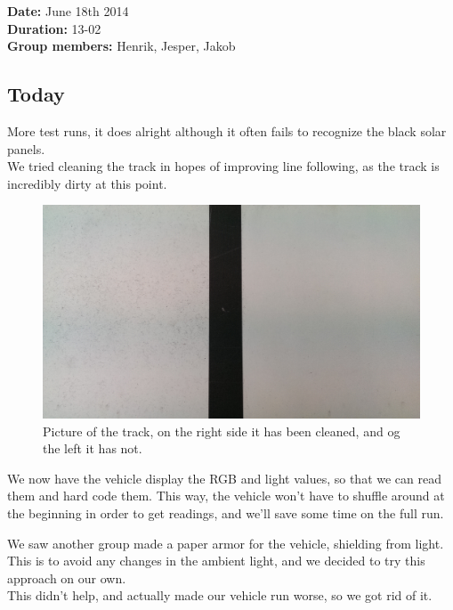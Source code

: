 \textbf{Date:} June 18th 2014\\\textbf{Duration:} 13-02\\\textbf{Group
members:} Henrik, Jesper, Jakob

\subsection{Today}

More test runs, it does alright although it often fails to recognize the
black solar panels.\\We tried cleaning the track in hopes of improving
line following, as the track is incredibly dirty at this
point.
\begin{figure}[hbt]
  \centering
  \includegraphics[scale=0.13]{../experiments/images/cleaning.jpg}
  \caption{Picture of the track, on the right side it has been cleaned, and og the left it has not.}
\end{figure}
We now have the vehicle display the RGB and light values, so that we can
read them and hard code them. This way, the vehicle won't have to
shuffle around at the beginning in order to get readings, and we'll save
some time on the full run.

We saw another group made a paper armor for the vehicle, shielding from
light. This is to avoid any changes in the ambient light, and we decided
to try this approach on our own.\\This didn't help, and actually made
our vehicle run worse, so we got rid of it.

